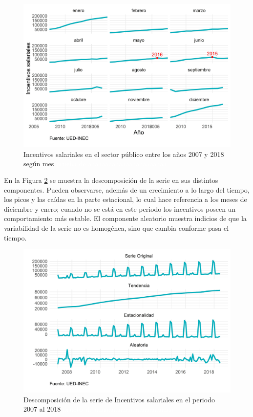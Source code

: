 \documentclass[
]{article}
\begin{document}
\begin{figure}[H]
\includegraphics[width=1\linewidth,height=1\textheight]{Tesis_files/figure-latex/incentivosplotperiodos-1} \caption{Incentivos salariales en el sector público entre los años 2007 y 2018 según mes \textcolor{white}{prueba de aaaaaaaaaaaaaaaaaaaaaaa}}\label{fig:incentivosplotperiodos}
\end{figure}

En la Figura \ref{fig:incentivosplotdescomposicion} se muestra la
descomposición de la serie en sus distintos componentes. Pueden
observarse, además de un crecimiento a lo largo del tiempo, los picos y
las caídas en la parte estacional, lo cual hace referencia a los meses
de diciembre y enero; cuando no se está en este periodo los incentivos
poseen un comportamiento más estable. El componente aleatorio muestra
indicios de que la variabilidad de la serie no es homogénea, sino que
cambia conforme pasa el tiempo.

\begin{figure}[H]
\includegraphics[width=1\linewidth,height=1\textheight]{Tesis_files/figure-latex/incentivosplotdescomposicion-1} \caption{Descomposición de la serie de Incentivos salariales en el periodo 2007 al 2018 \textcolor{white}{prueba de aaaaaaaaaaaaaaaaaaaaaaa}}\label{fig:incentivosplotdescomposicion}
\end{figure}
\end{document}
